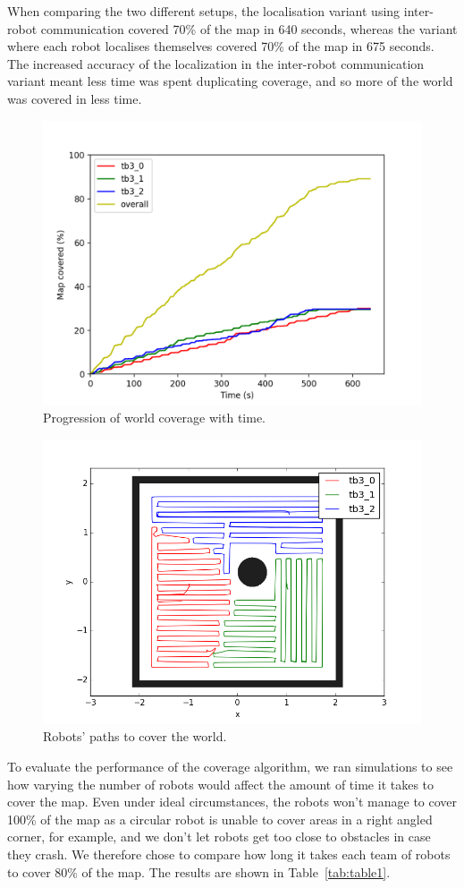 \documentclass[a4paper, 10pt, conference]{ieeeconf}      %
\begin{document}
When comparing the two different setups, the localisation variant using inter-robot communication covered 70\% of the map in 640 seconds, whereas the variant where each robot localises themselves covered 70\% of the map in 675 seconds. The increased accuracy of the localization in the inter-robot communication variant meant less time was spent duplicating coverage, and so more of the world was covered in less time.

\begin{figure}
	\centering
	\includegraphics[width=0.8\columnwidth]{ground_truth.png}
	\caption{Progression of world coverage with time.}
	\label{fig:ground_truth}
\end{figure}

\begin{figure}
	\centering
	\includegraphics[width=0.8\columnwidth]{ground_truth_coverage.png}
	\caption{Robots' paths to cover the world.}
	\label{fig:ground_truth_coverage}
\end{figure}

To evaluate the performance of the coverage algorithm, we ran simulations to see how varying the number of robots would affect the amount of time it takes to cover the map. Even under ideal circumstances, the robots won't manage to cover 100\% of the map as a circular robot is unable to cover areas in a right angled corner, for example, and we don't let robots get too close to obstacles in case they crash. We therefore chose to compare how long it takes each team of robots to cover 80\% of the map. The results are shown in Table~\ref{tab:table1}. 
\end{document}
